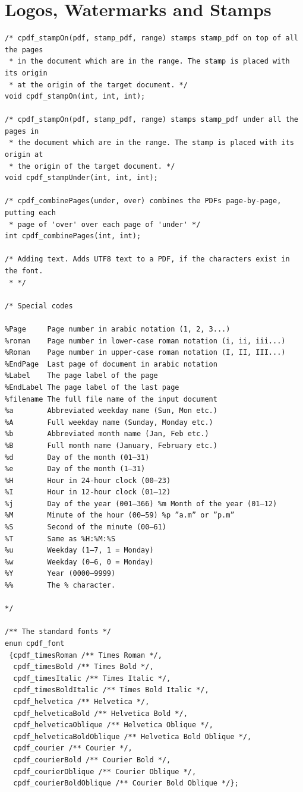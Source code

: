 \documentclass[a4paper]{memoir}
\begin{document}
\chapter{Logos, Watermarks and Stamps}
\begin{small}
\begin{lstlisting}
/* cpdf_stampOn(pdf, stamp_pdf, range) stamps stamp_pdf on top of all the pages
 * in the document which are in the range. The stamp is placed with its origin
 * at the origin of the target document. */
void cpdf_stampOn(int, int, int);

/* cpdf_stampOn(pdf, stamp_pdf, range) stamps stamp_pdf under all the pages in
 * the document which are in the range. The stamp is placed with its origin at
 * the origin of the target document. */
void cpdf_stampUnder(int, int, int);

/* cpdf_combinePages(under, over) combines the PDFs page-by-page, putting each
 * page of 'over' over each page of 'under' */
int cpdf_combinePages(int, int);

/* Adding text. Adds UTF8 text to a PDF, if the characters exist in the font.
 * */

/* Special codes

%Page     Page number in arabic notation (1, 2, 3...)
%roman    Page number in lower-case roman notation (i, ii, iii...)
%Roman    Page number in upper-case roman notation (I, II, III...)
%EndPage  Last page of document in arabic notation
%Label    The page label of the page
%EndLabel The page label of the last page
%filename The full file name of the input document
%a        Abbreviated weekday name (Sun, Mon etc.)
%A        Full weekday name (Sunday, Monday etc.)
%b        Abbreviated month name (Jan, Feb etc.)
%B        Full month name (January, February etc.)
%d        Day of the month (01–31)
%e        Day of the month (1–31)
%H        Hour in 24-hour clock (00–23)
%I        Hour in 12-hour clock (01–12)
%j        Day of the year (001–366) %m Month of the year (01–12)
%M        Minute of the hour (00–59) %p ”a.m” or ”p.m”
%S        Second of the minute (00–61)
%T        Same as %H:%M:%S
%u        Weekday (1–7, 1 = Monday)
%w        Weekday (0–6, 0 = Monday)
%Y        Year (0000–9999)
%%        The % character.

*/

/** The standard fonts */
enum cpdf_font
 {cpdf_timesRoman /** Times Roman */,
  cpdf_timesBold /** Times Bold */,
  cpdf_timesItalic /** Times Italic */,
  cpdf_timesBoldItalic /** Times Bold Italic */,
  cpdf_helvetica /** Helvetica */,
  cpdf_helveticaBold /** Helvetica Bold */,
  cpdf_helveticaOblique /** Helvetica Oblique */,
  cpdf_helveticaBoldOblique /** Helvetica Bold Oblique */,
  cpdf_courier /** Courier */,
  cpdf_courierBold /** Courier Bold */,
  cpdf_courierOblique /** Courier Oblique */,
  cpdf_courierBoldOblique /** Courier Bold Oblique */};


\end{lstlisting}
\end{small}
\end{document}
